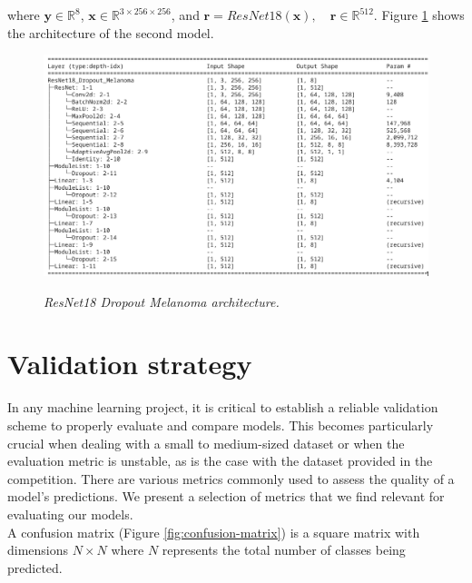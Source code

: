 where \( \mathbf{y} \in  \mathbb{R}^8 \), \( \mathbf{x}  \in \mathbb{R}^{3
\times 256 \times 256} \),  and \(\mathbf{r} = ResNet18(\mathbf{x}), \quad
\mathbf{r} \in \mathbb{R}^{512}\). Figure
\ref{fig:resnet-18-dropout-melanoma-arch} shows the architecture of the second
model.

\begin{figure}[H]
  \centering
  \includegraphics[width=\textwidth]{imatges/methodological_contribution/ResNet18_Dropout_Melanoma.png}
  \caption[ResNet18\_Dropout\_Melanoma architecture]{\textit{ResNet18 Dropout Melanoma architecture.}}
  {\label{fig:resnet-18-dropout-melanoma-arch}}
\end{figure}


\section{Validation strategy}

In any machine learning project, it is critical to establish a reliable
validation scheme to properly evaluate and compare models. This becomes
particularly crucial when dealing with a small to medium-sized dataset or when
the evaluation metric is unstable, as is the case with the dataset provided in
the competition. There are various metrics commonly used to assess the quality of a model's
predictions. We present a selection of metrics that we find relevant for
evaluating our models. \\

A confusion matrix (Figure \ref{fig:confusion-matrix}) is a square matrix with
dimensions \(N\times N\) where \(N\) represents the total number of classes
being predicted.

